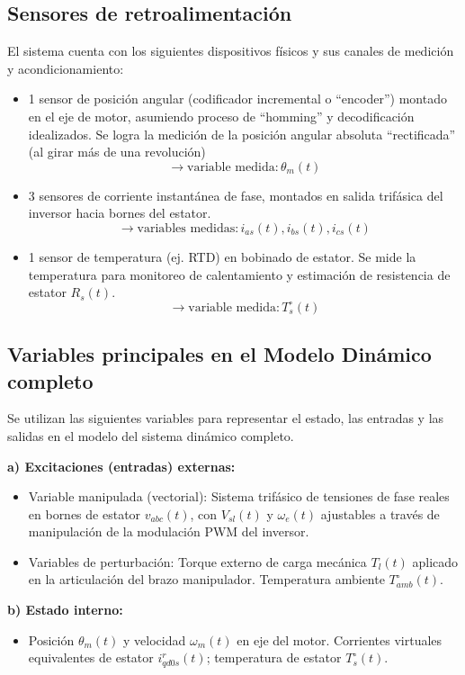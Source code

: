 \documentclass[a4paper, 10pt, onecolumn,journal]{ieeeconf}
\begin{document}
\subsection{\textbf{Sensores de retroalimentación}}

El sistema cuenta con los siguientes dispositivos físicos y sus canales de medición y acondicionamiento:
\begin{itemize}
    \item 1 sensor de posición angular (codificador incremental o “encoder”) montado en el eje de motor, asumiendo proceso de “homming” y decodificación idealizados. Se logra la medición de la posición angular absoluta “rectificada” (al girar más de una revolución)
    \[\rightarrow \text{variable medida}: \theta_m(t)\]
    \item 3 sensores de corriente instantánea de fase, montados en salida trifásica del inversor hacia bornes del estator.
    \[\rightarrow \text{variables medidas}: i_{as}(t), i_{bs}(t), i_{cs}(t)\]
    \item 1 sensor de temperatura (ej. RTD) en bobinado de estator. Se mide la temperatura para monitoreo de calentamiento y estimación de resistencia de estator $R_s(t)$.
    \[\rightarrow \text{variable medida}: T_s^{\circ}(t)\]
\end{itemize}

\subsection{\textbf{Variables principales en el Modelo Dinámico completo}}
Se utilizan las siguientes variables para representar el estado, las entradas y las salidas en el modelo del sistema dinámico completo.

\textbf{a) Excitaciones (entradas) externas:}
\begin{itemize}
    \item Variable manipulada (vectorial): Sistema trifásico de tensiones de fase reales en bornes de estator $v_{abc}(t)$, con $V_{sl}(t)$ y $\omega_e(t)$ ajustables a través de manipulación de la modulación PWM del inversor.
    \item Variables de perturbación: Torque externo de carga mecánica $T_l(t)$ aplicado en la articulación del brazo manipulador. Temperatura ambiente $T_{amb}^{\circ}(t)$.
\end{itemize}

\textbf{b) Estado interno:}
\begin{itemize}
    \item Posición $\theta_m(t)$ y velocidad $\omega_m(t)$ en eje del motor. Corrientes virtuales equivalentes de estator $i_{qd0s}^r(t)$; temperatura de estator $T_s^{\circ}(t)$.
\end{itemize}
\end{document}

